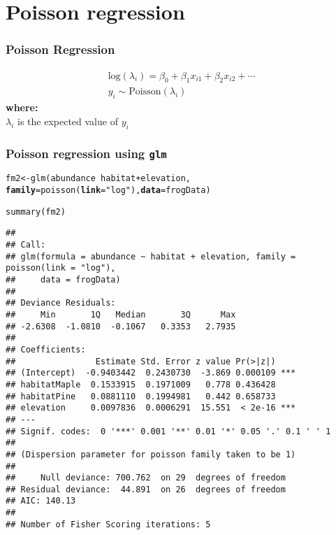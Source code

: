 \documentclass[color=usenames,dvipsnames]{beamer}\usepackage[]{graphicx}\usepackage[]{color}
\makeatletter
\newcommand{\hlstr}[1]{\textcolor[rgb]{0.749,0.012,0.012}{#1}}%
\newcommand{\hlopt}[1]{\textcolor[rgb]{0,0,0}{#1}}%
\newcommand{\hlstd}[1]{\textcolor[rgb]{0,0,0}{#1}}%
\newcommand{\hlkwb}[1]{\textcolor[rgb]{0,0.341,0.682}{#1}}%
\newcommand{\hlkwc}[1]{\textcolor[rgb]{0,0,0}{\textbf{#1}}}%
\newcommand{\hlkwd}[1]{\textcolor[rgb]{0.004,0.004,0.506}{#1}}%
\newenvironment{kframe}{%
 \def\at@end@of@kframe{}%
 \ifinner\ifhmode%
  \def\at@end@of@kframe{\end{minipage}}%
  \begin{minipage}{\columnwidth}%
 \fi\fi%
 \def\FrameCommand##1{\hskip\@totalleftmargin \hskip-\fboxsep
 \colorbox{shadecolor}{##1}\hskip-\fboxsep
     \hskip-\linewidth \hskip-\@totalleftmargin \hskip\columnwidth}%
 \MakeFramed {\advance\hsize-\width
   \@totalleftmargin\z@ \linewidth\hsize
   \@setminipage}}%
 {\par\unskip\endMakeFramed%
 \at@end@of@kframe}
\newenvironment{knitrout}{}{} %
\makeatother
\begin{document}
\section{Poisson regression}



\begin{frame}
  \frametitle{Poisson Regression}
    \begin{gather*}
      \mathrm{log}(\lambda_i) = \beta_0 + \beta_1 x_{i1} + \beta_2 x_{i2} + \cdots \\
      y_i \sim \mathrm{Poisson}(\lambda_i)
  \end{gather*}
  \pause
  {\bf where: \\}
  $\lambda_i$ is the expected value of $y_i$
\end{frame}







\begin{frame}[fragile]
  \frametitle{Poisson regression using {\tt glm}}
  \footnotesize
\begin{knitrout}\footnotesize
{}\color{fgcolor}\begin{kframe}
\begin{alltt}
\hlstd{fm2} \hlkwb{<-} \hlkwd{glm}\hlstd{(abundance} \hlopt{~} \hlstd{habitat} \hlopt{+} \hlstd{elevation,}
           \hlkwc{family}\hlstd{=}\hlkwd{poisson}\hlstd{(}\hlkwc{link}\hlstd{=}\hlstr{"log"}\hlstd{),} \hlkwc{data}\hlstd{=frogData)}
\end{alltt}
\end{kframe}
\end{knitrout}
\pause
\tiny
\begin{knitrout}\tiny
{}\color{fgcolor}\begin{kframe}
\begin{alltt}
\hlkwd{summary}\hlstd{(fm2)}
\end{alltt}
\begin{verbatim}
## 
## Call:
## glm(formula = abundance ~ habitat + elevation, family = poisson(link = "log"), 
##     data = frogData)
## 
## Deviance Residuals: 
##     Min       1Q   Median       3Q      Max  
## -2.6308  -1.0810  -0.1067   0.3353   2.7935  
## 
## Coefficients:
##                Estimate Std. Error z value Pr(>|z|)    
## (Intercept)  -0.9403442  0.2430730  -3.869 0.000109 ***
## habitatMaple  0.1533915  0.1971009   0.778 0.436428    
## habitatPine   0.0881110  0.1994981   0.442 0.658733    
## elevation     0.0097836  0.0006291  15.551  < 2e-16 ***
## ---
## Signif. codes:  0 '***' 0.001 '**' 0.01 '*' 0.05 '.' 0.1 ' ' 1
## 
## (Dispersion parameter for poisson family taken to be 1)
## 
##     Null deviance: 700.762  on 29  degrees of freedom
## Residual deviance:  44.891  on 26  degrees of freedom
## AIC: 140.13
## 
## Number of Fisher Scoring iterations: 5
\end{verbatim}
\end{kframe}
\end{knitrout}
\end{frame}
\end{document}
